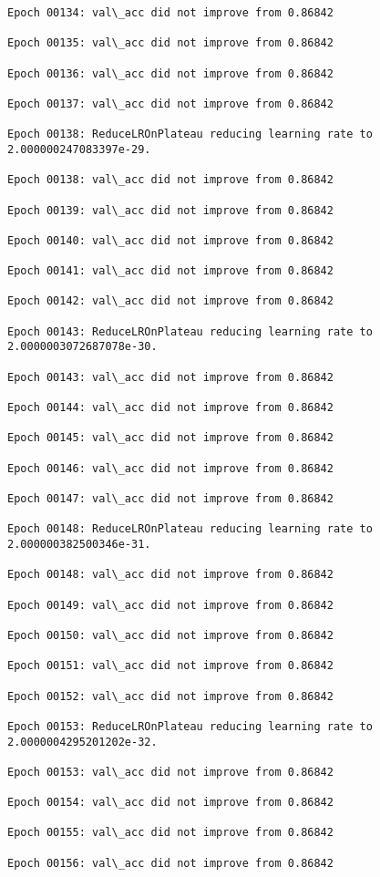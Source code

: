 \documentclass[11pt]{article}
\begin{document}
\begin{Verbatim}[commandchars=\\\{\}]
Epoch 00134: val\_acc did not improve from 0.86842

Epoch 00135: val\_acc did not improve from 0.86842

Epoch 00136: val\_acc did not improve from 0.86842

Epoch 00137: val\_acc did not improve from 0.86842

Epoch 00138: ReduceLROnPlateau reducing learning rate to 2.000000247083397e-29.

Epoch 00138: val\_acc did not improve from 0.86842

Epoch 00139: val\_acc did not improve from 0.86842

Epoch 00140: val\_acc did not improve from 0.86842

Epoch 00141: val\_acc did not improve from 0.86842

Epoch 00142: val\_acc did not improve from 0.86842

Epoch 00143: ReduceLROnPlateau reducing learning rate to 2.0000003072687078e-30.

Epoch 00143: val\_acc did not improve from 0.86842

Epoch 00144: val\_acc did not improve from 0.86842

Epoch 00145: val\_acc did not improve from 0.86842

Epoch 00146: val\_acc did not improve from 0.86842

Epoch 00147: val\_acc did not improve from 0.86842

Epoch 00148: ReduceLROnPlateau reducing learning rate to 2.000000382500346e-31.

Epoch 00148: val\_acc did not improve from 0.86842

Epoch 00149: val\_acc did not improve from 0.86842

Epoch 00150: val\_acc did not improve from 0.86842

Epoch 00151: val\_acc did not improve from 0.86842

Epoch 00152: val\_acc did not improve from 0.86842

Epoch 00153: ReduceLROnPlateau reducing learning rate to 2.0000004295201202e-32.

Epoch 00153: val\_acc did not improve from 0.86842

Epoch 00154: val\_acc did not improve from 0.86842

Epoch 00155: val\_acc did not improve from 0.86842

Epoch 00156: val\_acc did not improve from 0.86842


\end{Verbatim}
\end{document}
